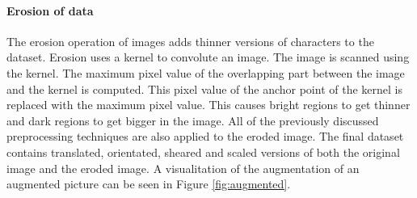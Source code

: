 \documentclass{article}
\begin{document}
\paragraph{Erosion of data}
The erosion operation of images adds thinner versions of characters to the dataset. Erosion uses a kernel to convolute an image. 
The image is scanned using the kernel. The maximum pixel value of the overlapping part between the image and the kernel is computed. This pixel value of the anchor point of the kernel is replaced with the maximum pixel value. 
This causes bright regions to get thinner and dark regions to get bigger in the image.  
All of the previously discussed preprocessing techniques are also applied to the eroded image. The final dataset contains translated, orientated, sheared and scaled versions of both the original image and the eroded image. A visualitation of the augmentation of an augmented picture can be seen in Figure \ref{fig:augmented}.
\end{document}

